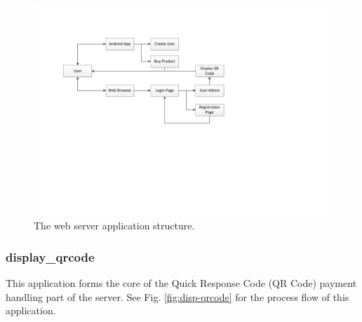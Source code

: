 \begin{figure}
 \centering 
 \includegraphics[clip=true, trim = 50 260 0 90,
 scale=0.7]{website_structure}
 \caption{The web server application structure.}
 \label{fig:website-apps}
\end{figure}

\subsubsection{display\_qrcode}

This application forms the core of the Quick Response Code (QR Code) payment handling
part of the server. See Fig. \ref{fig:disp-qrcode} for the process flow of
this application.

